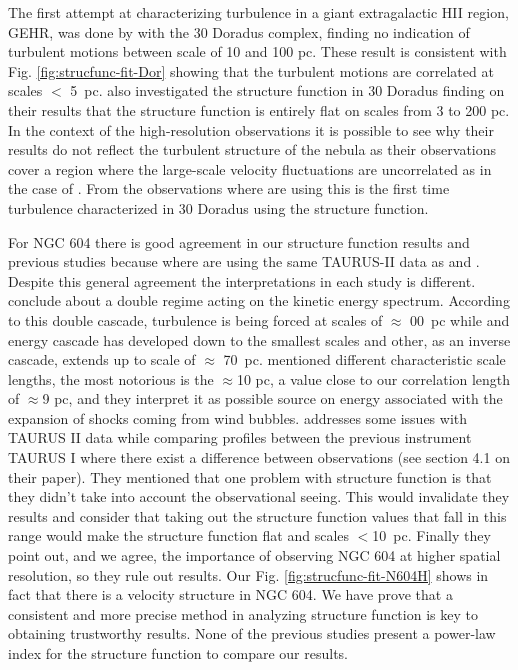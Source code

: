 \documentclass[fleqn,usenatbib, useAMS, a4paper]{mnras}
\begin{document}
The first attempt at characterizing turbulence in a giant extragalactic HII region, GEHR, was done by \citet{1961MNRAS.122....1F} with the 30 Doradus complex, finding no indication of turbulent motions between scale of 10 and 100 pc.
These result is consistent with Fig. \ref{fig:strucfunc-fit-Dor} showing that the turbulent motions are correlated at scales \(<\) \SI{5}{pc}.
\citet{Melnick:2021x} also investigated the structure function in 30 Doradus finding on their results that the structure function is entirely flat on scales from 3 to 200 pc.
In the context of the high-resolution observations it is possible to see why their results do not reflect the turbulent structure of the nebula as their observations cover a region where the large-scale velocity fluctuations are uncorrelated as in the case of \citet{1961MNRAS.122....1F}.
From the observations where are using this is the first time turbulence characterized in 30 Doradus using the structure function.

For NGC 604 there is good agreement in our structure function results and previous studies because where are using the same TAURUS-II data as \citet{Melnick:2021x} and \citet{Medina-Tanco:1997a}.
Despite this general agreement the interpretations in each study is different.
\citet{Medina-Tanco:1997a} conclude about a double regime acting on the kinetic energy spectrum.
According to this double cascade, turbulence is being forced at scales of \(\approx\) \SI{00}{pc} while and energy cascade has developed down to the smallest scales and other, as an inverse cascade, extends up to scale of \(\approx\) \SI{70}{pc}.
\citet{Medina-Tanco:1997a} mentioned different characteristic scale lengths, the most notorious is the \(\approx\)10 pc, a value close to our correlation length of \(\approx\)9 pc, and they interpret it as possible source on energy associated with the expansion of shocks coming from wind bubbles.  
\citet{Melnick:2021x} addresses some issues with TAURUS II data while comparing profiles between the previous instrument TAURUS I where there exist a difference between observations (see section 4.1 on their paper).
They mentioned that one problem with \citet{Medina-Tanco:1997a} structure function is that they didn't take into account the observational seeing.
This would invalidate they results and \citet{Melnick:2021x} consider that taking out the structure function values that fall in this range would make the structure function flat and scales \(<\)\SI{10}{pc}.
Finally they point out, and we agree, the importance of observing NGC 604 at higher spatial resolution, so they rule out \citet{Medina-Tanco:1997a} results. 
Our Fig. \ref{fig:strucfunc-fit-N604H} shows in fact that there is a velocity structure in NGC 604. 
We have prove that a consistent and more precise method in analyzing structure function is key to obtaining trustworthy results.
None of the previous studies present a power-law index for the structure function to compare our results.
\end{document}
